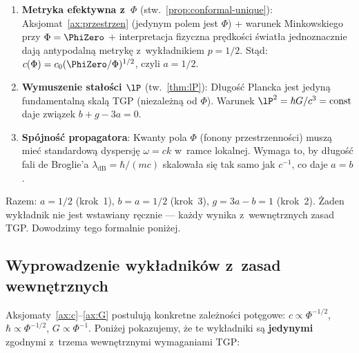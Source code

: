 \begin{remark}[Trzy kroki do $(a,b,g) = (1/2, 1/2, 1)$]\label{rem:hierarchia-skalowania}
\begin{enumerate}
  \item \textbf{Metryka efektywna z~$\Phi$}
    (stw.~\ref{prop:conformal-unique}):
    Aksjomat~\ref{ax:przestrzen} (jedynym polem jest $\Phi$)
    + warunek Minkowskiego przy $\Phi = \PhiZero$
    + interpretacja fizyczna pr\k{e}dko\'sci \'swiat\l{}a
    jednoznacznie daj\k{a} antypodaln\k{a} metryk\k{e}
    z~wyk\l{}adnikiem $p = 1/2$. St\k{a}d:
    $c(\Phi) = c_0(\PhiZero/\Phi)^{1/2}$, czyli $a = 1/2$.

  \item \textbf{Wymuszenie sta\l{}o\'sci $\lP$}
    (tw.~\ref{thm:lP}):
    D\l{}ugo\'s\'c Plancka jest jedyn\k{a} fundamentaln\k{a}
    skal\k{a} TGP (niezale\.zn\k{a} od $\Phi$).
    Warunek $\lP^2 = \hbar G / c^3 = \mathrm{const}$
    daje zwi\k{a}zek $b + g - 3a = 0$.

  \item \textbf{Sp\'ojno\'s\'c propagatora}:
    Kwanty pola $\Phi$ (fonony przestrzenno\'sci) musz\k{a}
    mie\'c standardow\k{a} dyspersj\k{e} $\omega = ck$
    w~ramce lokalnej. Wymaga to, by d\l{}ugo\'s\'c fali
    de Broglie'a $\lambda_{\mathrm{dB}} = \hbar/(mc)$
    skalowa\l{}a si\k{e} tak samo jak $c^{-1}$, co daje $a = b$.
\end{enumerate}

Razem: $a = 1/2$ (krok~1), $b = a = 1/2$ (krok~3),
$g = 3a - b = 1$ (krok~2). \.Zaden wyk\l{}adnik nie jest
wstawiany r\k{e}cznie --- ka\.zdy wynika z~wewn\k{e}trznych
zasad TGP. Dowodzimy tego formalnie poni\.zej.
\end{remark}

\subsection{Wyprowadzenie wyk\l{}adnik\'ow z~zasad
  wewn\k{e}trznych}\label{ssec:wykladniki}

Aksjomaty~\ref{ax:c}--\ref{ax:G} postuluj\k{a} konkretne
zale\.zno\'sci pot\k{e}gowe: $c \propto \Phi^{-1/2}$,
$\hbar \propto \Phi^{-1/2}$, $G \propto \Phi^{-1}$.
Poni\.zej pokazujemy, \.ze te wyk\l{}adniki s\k{a}
\textbf{jedynymi} zgodnymi z~trzema wewn\k{e}trznymi
wymaganiami TGP:

